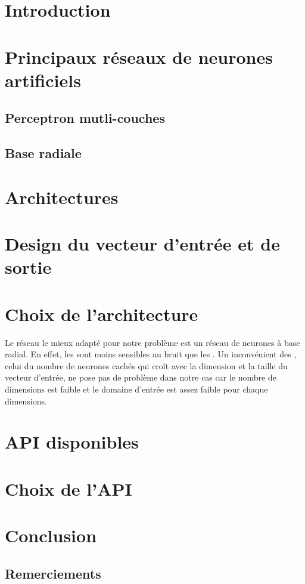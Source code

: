 \documentclass[12pt,a4paper,oneside, titlepage]{article}
\begin{document}


\tableofcontents
\section{Introduction}
\section{Principaux réseaux de neurones artificiels}
\subsection{Perceptron mutli-couches}
\subsection{Base radiale}
\section{Architectures}
\section{Design du vecteur d'entrée et de sortie}
\section{Choix de l'architecture}
Le réseau le mieux adapté pour notre problème est un réseau de neurones à base radial.
En effet, les \rbf sont moins sensibles au bruit que les \mlp \cite{adversarial,Gauthier}.%
Un inconvénient des \rbf, celui du nombre de neurones cachés qui croît avec la dimension et la taille du vecteur d'entrée, ne pose pas de problème dans notre cas
car le nombre de dimensions est faible
et le domaine d'entrée est assez faible pour chaque dimensions.
\section{API disponibles}
\section{Choix de l'API}
\section{Conclusion}
\subsection*{Remerciements}


\end{document}
